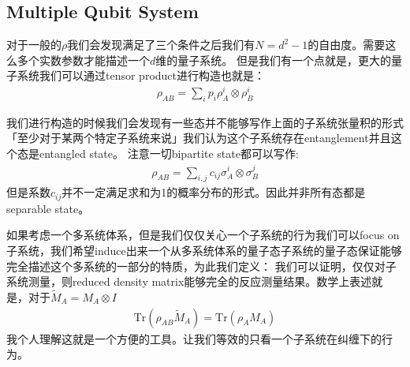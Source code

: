 \subsection{Multiple Qubit System}

\bigskip
{}

对于一般的$ \rho $我们会发现满足了三个条件之后我们有$ N=d^2- 1 $的自由度。需要这么多个实数参数才能描述一个$ d $维的量子系统。
但是我们有一个点就是，更大的量子系统我们可以通过tensor product进行构造也就是：
\begin{align}
  \rho_{AB} = \sum_i p_i \rho_A^i \otimes \rho_B^i
\end{align}

\bigskip
{}

我们进行构造的时候我们会发现有一些态并不能够写作上面的子系统张量积的形式「至少对于某两个特定子系统来说」我们认为这个子系统存在entanglement并且这个态是entangled
state。
注意一切bipartite state都可以写作:
\begin{align}
  \rho_{AB} = \sum_{i,j} c_{ij} \sigma_A^i \otimes \sigma_B^j
\end{align}
但是系数$ c_{ij} $并不一定满足求和为1的概率分布的形式。因此并非所有态都是separable state。

\bigskip
{}

如果考虑一个多系统体系，但是我们仅仅关心一个子系统的行为我们可以focus on
子系统，我们希望induce出来一个从多系统体系的量子态子系统的量子态保证能够完全描述这个多系统的一部分的特质，为此我们定义：
我们可以证明，仅仅对子系统测量，则reduced density matrix能够完全的反应测量结果。数学上表述就是，对于$
\tilde{M}_A = M_A \otimes I $
\begin{align}
  \mathrm{Tr}(\rho_{AB} \tilde{M}_A) = \mathrm{Tr}(\rho_A M_A)
\end{align}
我个人理解这就是一个方便的工具。让我们等效的只看一个子系统在纠缠下的行为。

